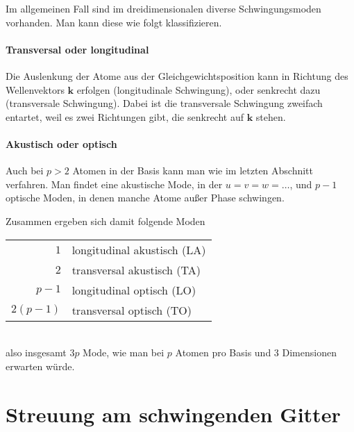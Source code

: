 Im allgemeinen Fall sind im dreidimensionalen diverse Schwingungsmoden vorhanden. Man kann diese wie folgt klassifizieren.

\paragraph{Transversal oder longitudinal} Die Auslenkung der Atome aus der Gleichgewichtsposition kann in Richtung des Wellenvektors $\mathbf{k}$ erfolgen (longitudinale Schwingung), oder senkrecht dazu (transversale Schwingung). Dabei ist die transversale Schwingung zweifach entartet, weil es zwei Richtungen gibt, die senkrecht auf $\mathbf{k}$ stehen.


\paragraph{Akustisch  oder optisch} Auch bei $p > 2$  Atomen in der Basis kann man wie im letzten Abschnitt verfahren. Man findet eine akustische Mode, in der $u = v = w = \dots$, und $p -1$ optische Moden, in denen manche Atome außer Phase schwingen.

Zusammen ergeben sich damit folgende Moden \\
\begin{tabular}{rl}
$1$ & longitudinal akustisch (LA)\\
$2$ & transversal akustisch (TA) \\
$p-1$ & longitudinal optisch (LO) \\
$2(p-1)$ & transversal optisch (TO) \\
\end{tabular} \\
also insgesamt $3p$ Mode, wie man bei $p$ Atomen pro Basis und 3 Dimensionen erwarten würde.






\section{Streuung am schwingenden Gitter}

